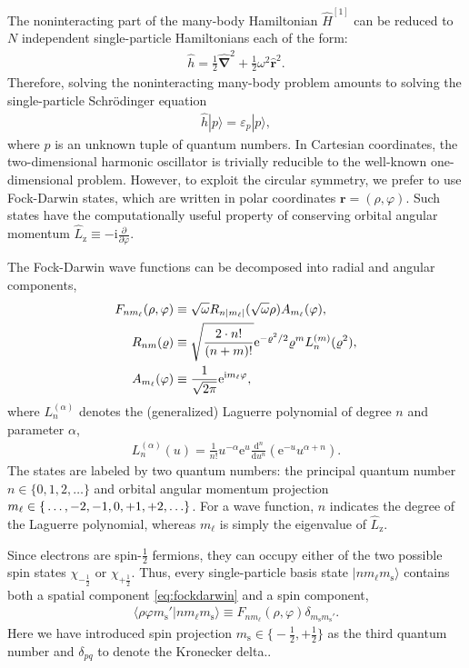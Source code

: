 The noninteracting part of the many-body Hamiltonian $\hat{H}^{[1]}$ can be reduced to $N$ independent single-particle Hamiltonians each of the form:
\begin{align*}
  \hat{h} = \frac{1}{2} \hat{\bm{\nabla}}^2 + \frac{1}{2} \omega^2 \hat{\bm{r}}^2.
\end{align*}
Therefore, solving the noninteracting many-body problem amounts to solving the single-particle Schr\"odinger equation
\begin{align*}
  \hat{h} |p\rangle = \varepsilon_p |p\rangle,
\end{align*}
where $p$ is an unknown tuple of quantum numbers.  In Cartesian coordinates, the two-dimensional harmonic oscillator is trivially reducible to the well-known one-dimensional problem.  However, to exploit the circular symmetry, we prefer to use Fock-Darwin states, which are written in polar coordinates $\bm{r} = (\rho, \varphi)$.  Such states have the computationally useful property of conserving orbital angular momentum $\hat{L}_{\mathrm{z}} \equiv -\mathrm{i} \frac{\partial}{\partial \varphi}$.

The Fock-Darwin wave functions can be decomposed into radial and angular components,\cite{lohne2010coupled}
\begin{align}
  F_{n m_\ell}(\rho, \varphi) &\equiv \sqrt\omega R_{n |m_\ell|}(\sqrt \omega \rho) A_{m_\ell}(\varphi) \label{eq:fockdarwin}, \\
  R_{n m}(\varrho) &\equiv \sqrt{\frac{2 \cdot n!}{(n + m)!}} \mathrm{e}^{-\varrho^2 / 2} \varrho^m L_n^{(m)}(\varrho^2), \notag \\
  A_{m_\ell}(\varphi) &\equiv \frac{1}{\sqrt{2 \pi}} \mathrm{e}^{\mathrm{i} m_\ell \varphi}, \notag
\end{align}
where $L_n^{(\alpha)}$ denotes the (generalized) Laguerre polynomial \cite{NIST:DLMF} of degree $n$ and parameter $\alpha$,
\begin{align*}
  L_n^{(\alpha)}(u) = \frac{1}{n!} u^{-\alpha} \mathrm{e}^u \frac{\mathrm{d}^n}{\mathrm{d} u^n} (\mathrm{e}^{-u} u^{\alpha + n}).
\end{align*}
The states are labeled by two quantum numbers: the principal quantum number $n \in \{0, 1, 2, \ldots\}$ and orbital angular momentum projection $m_\ell \in \mathbb \{\ldots, -2, -1, 0, +1, +2, \ldots\}$.  For a wave function, $n$ indicates the degree of the Laguerre polynomial, whereas $m_\ell$ is simply the eigenvalue of $\hat{L}_{\mathrm{z}}$.

Since electrons are spin-$\frac{1}{2}$ fermions, they can occupy either of the two possible spin states $\chi_{-\frac{1}{2}}$ or $\chi_{+\frac{1}{2}}$.  Thus, every single-particle basis state $|n m_\ell m_{\mathrm{s}}\rangle$ contains both a spatial component \eqref{eq:fockdarwin} and a spin component,
\begin{align} \label{eq:singleparticlestate}
  \langle \rho \varphi m_{\mathrm{s}}' |n m_\ell m_{\mathrm{s}}\rangle \equiv F_{n m_\ell}(\rho, \varphi) \delta_{m_{\mathrm{s}}^{} m_{\mathrm{s}}'}.
\end{align}
Here we have introduced spin projection $m_{\mathrm{s}} \in \bigl\{-\frac{1}{2}, +\frac{1}{2}\bigr\}$ as the third quantum number and $\delta_{p q}$ to denote the Kronecker delta..

